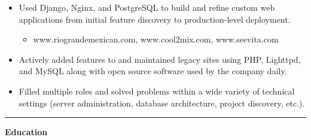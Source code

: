 \documentclass[11pt]{article}
\makeatletter
\newcommand{\headerrow}[2]
{\begin{tabular*}{\linewidth}{l@{\extracolsep{\fill}}r}
	#1 &
	#2 \\
\end{tabular*}}
\makeatother
\begin{document}
\vspace{-0.8em}
\begin{itemize}
	\item Used Django, Nginx, and PostgreSQL to build and refine custom web applications from initial feature discovery to production-level deployment.
	\vspace{-0.6em}
	\begin{itemize}
		\item www.riograndemexican.com, www.cool2mix.com, www.seevita.com
	\end{itemize}
	\vspace{-1.0em}
	\item Actively added features to and maintained legacy sites using PHP, Lighttpd, and MySQL along with open source software used by the company daily. 
	\vspace{-0.6em}
	\item Filled multiple roles and solved problems within a wide variety of technical settings (server administration, database architecture, project discovery, etc.).
\end{itemize}

%
%	

\vspace{0.2em}

\hrule
\vspace{0.6em}

\begin{LARGE}\bf{Education}\end{LARGE} \begin{Large}
	
\end{Large}
\end{document}
